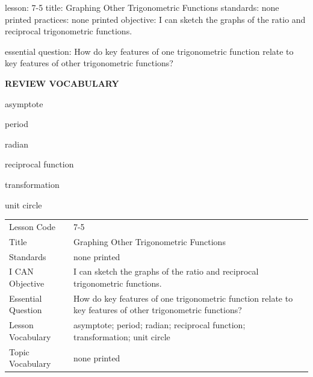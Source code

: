 \documentclass{article}
\newenvironment{lesson-meta}{}{}        %
\newcommand{\te}[1]{}                   %
\begin{document}
\begin{lesson-meta}
lesson: 7-5
title: Graphing Other Trigonometric Functions
standards: none printed
practices: none printed
objective: I can sketch the graphs of the ratio and reciprocal trigonometric functions.

essential question: How do key features of one trigonometric function relate to key features of other trigonometric functions?

\textbf{REVIEW VOCABULARY}
\item asymptote
\item period
\item radian
\item reciprocal function
\item transformation
\item unit circle
\te{No separate topic vocabulary list is printed on these pages.}
\begin{tabular}{ll}
Lesson Code & 7-5 \\
Title & Graphing Other Trigonometric Functions \\
Standards & none printed \\
I CAN Objective & I can sketch the graphs of the ratio and reciprocal trigonometric functions. \\
Essential Question & How do key features of one trigonometric function relate to key features of other trigonometric functions? \\
Lesson Vocabulary & asymptote; period; radian; reciprocal function; transformation; unit circle \\
Topic Vocabulary & none printed \\
\end{tabular}
\end{lesson-meta}
\end{document}
